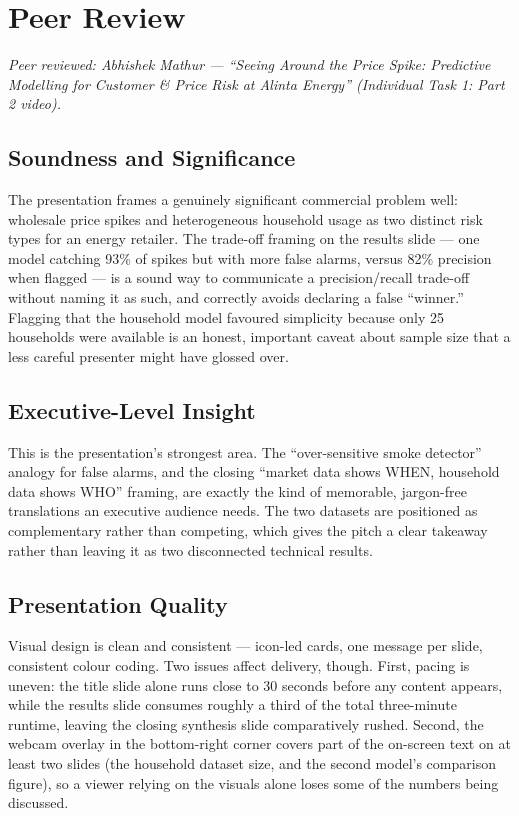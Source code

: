 \section{Peer Review}
\label{sec:Peer Review}

\noindent\emph{Peer reviewed: Abhishek Mathur --- ``Seeing Around the Price Spike: Predictive
Modelling for Customer \& Price Risk at Alinta Energy'' (Individual Task 1: Part 2 video).}

\subsection*{Soundness and Significance}

The presentation frames a genuinely significant commercial problem well: wholesale price spikes
and heterogeneous household usage as two distinct risk types for an energy retailer. The
trade-off framing on the results slide --- one model catching 93\% of spikes but with more false
alarms, versus 82\% precision when flagged --- is a sound way to communicate a precision/recall
trade-off without naming it as such, and correctly avoids declaring a false ``winner.'' Flagging
that the household model favoured simplicity because only 25 households were available is an
honest, important caveat about sample size that a less careful presenter might have glossed over.

\subsection*{Executive-Level Insight}

This is the presentation's strongest area. The ``over-sensitive smoke detector'' analogy for
false alarms, and the closing ``market data shows WHEN, household data shows WHO'' framing, are
exactly the kind of memorable, jargon-free translations an executive audience needs. The two
datasets are positioned as complementary rather than competing, which gives the pitch a clear
takeaway rather than leaving it as two disconnected technical results.

\subsection*{Presentation Quality}

Visual design is clean and consistent --- icon-led cards, one message per slide, consistent
colour coding. Two issues affect delivery, though. First, pacing is uneven: the title slide alone
runs close to 30 seconds before any content appears, while the results slide consumes roughly a
third of the total three-minute runtime, leaving the closing synthesis slide comparatively
rushed. Second, the webcam overlay in the bottom-right corner covers part of the on-screen text
on at least two slides (the household dataset size, and the second model's comparison figure), so
a viewer relying on the visuals alone loses some of the numbers being discussed.

